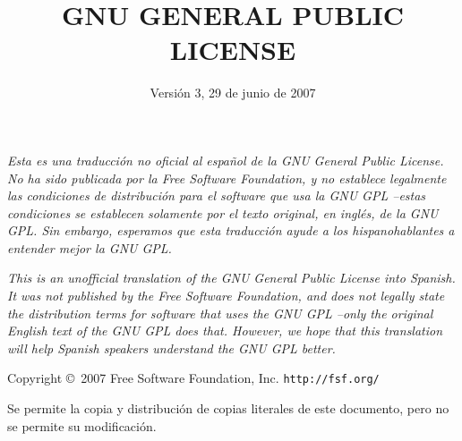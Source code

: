 \documentclass[11pt]{article}
\title{GNU GENERAL PUBLIC LICENSE}
\date{Versi\'{o}n 3, 29 de junio de 2007}
\begin{document}
\maketitle

\textit{Esta es una traducci\'{o}n no oficial al espa\~nol de la GNU General Public License. No ha sido publicada por la Free Software Foundation, y no establece legalmente las condiciones de distribuci\'{o}n para el software que usa la GNU GPL --estas condiciones se establecen solamente por el texto original, en ingl\'{e}s, de la GNU GPL. Sin embargo, esperamos que esta traducci\'{o}n ayude a los hispanohablantes a entender mejor la GNU GPL. }

\vspace{0.4cm}

\textit{This is an unofficial translation of the GNU General Public License 
into Spanish. It was not published by the Free Software Foundation, and 
does not legally state the distribution terms for software that uses the 
GNU GPL --only the original English text of the GNU GPL does that. However, 
we hope that this translation will help Spanish speakers understand the 
GNU GPL better.}

\begin{center}
{\parindent 0in

Copyright \copyright\  2007 Free Software Foundation, Inc. \texttt{http://fsf.org/}
  
 
\bigskip
Se permite la copia y distribuci\'{o}n de copias literales de este documento, pero no se permite su modificaci\'{o}n. }

\end{center}
\end{document}
